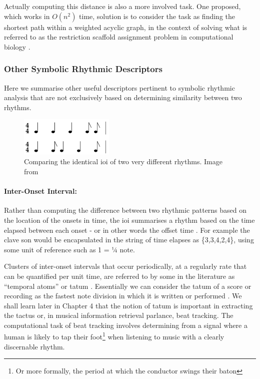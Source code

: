 Actually computing this distance is also a more involved task. One proposed, which works in $O(n^{2})$ time, solution is to consider the task as finding the shortest path within a weighted acyclic graph, in the context of solving what is referred to as the restriction scaffold assignment problem in computational biology \citep{Colannino2005}.

\subsubsection{Other Symbolic Rhythmic Descriptors}

Here we summarise other useful descriptors pertinent to symbolic rhythmic analysis that are not exclusively based on determining similarity between two rhythms.

\begin{figure}
	\begin{center}
		\includegraphics[width=0.4\textwidth]{ch03_symbolic/figures/ioi_comparison.png}
	\end{center}
	\caption[Comparing the identical IOI of two very different rhythms.]{Comparing the identical \acrshort{ioi} of two very different rhythms. Image from \cite{Dixon2004} }
	\label{fig:ioi_comparison}
\end{figure}


\paragraph{Inter-Onset Interval:} 
Rather than computing the difference between two rhythmic patterns based on the location of the onsets in time, the \acrfull{ioi} summarises a rhythm based on the time elapsed between each onset - or in other words the offset time \citep{Toussaint2013}. For example the clave son would be encapsulated in the string of time elapses as \{3,3,4,2,4\}, using some unit of reference such as 1 = ¼ note. 

Clusters of inter-onset intervals that occur periodically, at a regularly rate that can be quantified per unit time, are referred to by some in the literature as “temporal atoms” or tatum \citep{Bilmes1993, Sethares2007, Jehan2005}. Essentially we can consider the tatum of a score or recording as the fastest note division in which it is written or performed \citep{Sethares2007}. We shall learn later in Chapter 4 that the notion of tatum is important in extracting the tactus or, in musical information retrieval parlance, beat tracking. The computational task of beat tracking involves determining from a signal where a human is likely to tap their foot\footnote{Or more formally, the period at which the conductor swings their baton} when listening to music with a clearly discernable rhythm. 

